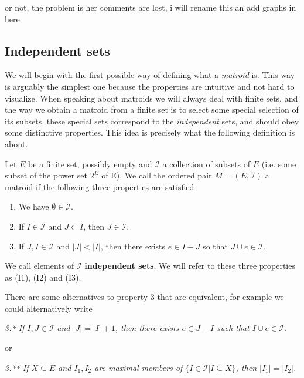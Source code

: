 or not, the problem is her comments are lost, i will rename this an add graphs in here

\subsection{Independent sets}

We will begin with the first possible way of defining what a \textit{matroid} is. This way is arguably the simplest one because the properties are intuitive and not hard to visualize. When speaking about matroids we will always deal with finite sets, and the way we obtain a matroid from a finite set is to select some special selection of its subsets.  these special sets correspond to the \textit{independent} sets, and should obey some distinctive properties. This idea is precisely what the following definition is about.

\begin{defn}
    Let $E$ be a finite set, possibly empty and $\mathcal{I}$ a collection of subsets of $E$ (i.e. some subset of the power set $2^E$ of E). We call the ordered pair $M = (E, \mathcal{I})$ a matroid if the following three properties are satisfied

    \begin{enumerate}
        \item We have $\emptyset \in \mathcal{I}$.
        
        \item If $I \in \mathcal{I}$ and $J \subset I$, then $J \in \mathcal{I}$.
        
        \item If $J, I \in \mathcal{I}$ and $|J| < |I|$, then there exists $e \in I - J$ so that $J \cup e \in \mathcal{I}$.
    \end{enumerate}

    We call elements of $\mathcal{I}$ \textbf{independent sets}. We will refer to these three properties as (I1), (I2) and (I3).
\end{defn}

There are some  alternatives to property 3 that are equivalent, for example we could alternatively write

\textit{3.* If $I, J \in \mathcal{I} $ and $|J| = |I| + 1$, then there exists $e \in J - I$ such that $I \cup e \in \mathcal{I}$.}

or

\textit{3.** If $X \subseteq E$ and $I_1, I_2$ are maximal members of $\{ I \in \mathcal{I} | I \subseteq X \}$, then $|I_1| = |I_2|$.}

